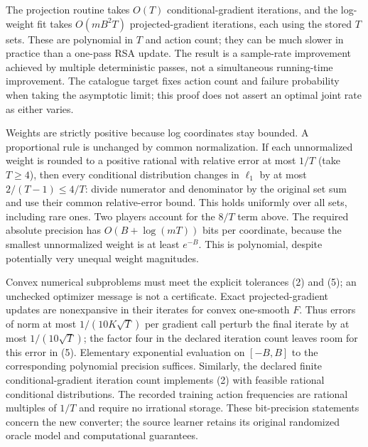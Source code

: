 \documentclass[11pt,a4paper]{article}
\begin{document}
The projection routine takes $O(T)$ conditional-gradient iterations, and the log-weight fit takes $O(mB^2T)$ projected-gradient iterations, each using the stored $T$ sets. These are polynomial in $T$ and action count; they can be much slower in practice than a one-pass RSA update. The result is a sample-rate improvement achieved by multiple deterministic passes, not a simultaneous running-time improvement. The catalogue target fixes action count and failure probability when taking the asymptotic limit; this proof does not assert an optimal joint rate as either varies.

Weights are strictly positive because log coordinates stay bounded. A proportional rule is unchanged by common normalization. If each unnormalized weight is rounded to a positive rational with relative error at most $1/T$ (take $T\ge4$), then every conditional distribution changes in $\ell_1$ by at most $2/(T-1)\le4/T$: divide numerator and denominator by the original set sum and use their common relative-error bound. This holds uniformly over all sets, including rare ones. Two players account for the $8/T$ term above. The required absolute precision has $O(B+\log(mT))$ bits per coordinate, because the smallest unnormalized weight is at least $e^{-B}$. This is polynomial, despite potentially very unequal weight magnitudes.

Convex numerical subproblems must meet the explicit tolerances (2) and (5); an unchecked optimizer message is not a certificate. Exact projected-gradient updates are nonexpansive in their iterates for convex one-smooth $F$. Thus errors of norm at most $1/(10K\sqrt T)$ per gradient call perturb the final iterate by at most $1/(10\sqrt T)$; the factor four in the declared iteration count leaves room for this error in (5). Elementary exponential evaluation on $[-B,B]$ to the corresponding polynomial precision suffices. Similarly, the declared finite conditional-gradient iteration count implements (2) with feasible rational conditional distributions. The recorded training action frequencies are rational multiples of $1/T$ and require no irrational storage. These bit-precision statements concern the new converter; the source learner retains its original randomized oracle model and computational guarantees.
\end{document}
